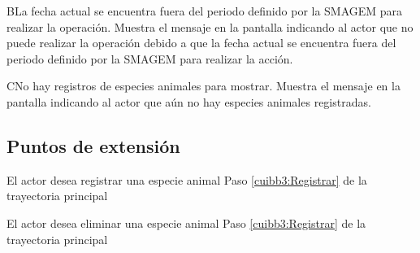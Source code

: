     \begin{UCtrayectoriaA}{B}{La fecha actual se encuentra fuera del periodo definido por la SMAGEM para realizar la operación.}
    \UCpaso[\UCsist] Muestra el mensaje  en la pantalla  indicando al actor que no puede realizar la operación debido a que la fecha actual se encuentra fuera del periodo definido por la SMAGEM para realizar la acción. 
 \end{UCtrayectoriaA}
 
  \begin{UCtrayectoriaA}{C}{No hay registros de especies animales para mostrar.}
    \UCpaso[\UCsist] Muestra el mensaje  en la pantalla  indicando al actor que aún no hay especies animales registradas. 
 \end{UCtrayectoriaA}


\subsection{Puntos de extensión}

\UCExtensionPoint
{El actor desea registrar una especie animal}
{ Paso \ref{cuibb3:Registrar} de la trayectoria principal}
{}

\UCExtensionPoint
{El actor desea eliminar una especie animal}
{ Paso \ref{cuibb3:Registrar} de la trayectoria principal}
{}
